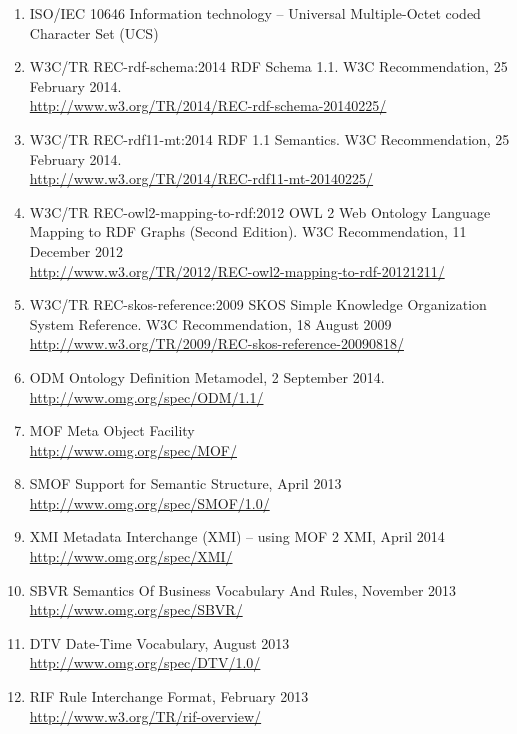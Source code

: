 \documentclass[10pt, a4paper]{isov2}
\begin{document}
\begin{enumerate}[label=\bfseries NR\arabic*]
  \item{ISO/IEC 10646} {Information technology – Universal Multiple-Octet coded Character Set (UCS)}\label{nref-UCS}
  \item{W3C/TR REC-rdf-schema:2014} {RDF Schema 1.1. W3C Recommendation, 25 February 2014.\\ \url{http://www.w3.org/TR/2014/REC-rdf-schema-20140225/}}\label{nref-RDFS}
  \item{W3C/TR REC-rdf11-mt:2014} {RDF 1.1 Semantics.  W3C Recommendation, 25 February 2014. \\ \url{http://www.w3.org/TR/2014/REC-rdf11-mt-20140225/}}\label{nref-RDFSs}
  \item{W3C/TR REC-owl2-mapping-to-rdf:2012} {OWL 2 Web Ontology Language
Mapping to RDF Graphs (Second Edition).  W3C Recommendation, 11 December 2012\\ \url{http://www.w3.org/TR/2012/REC-owl2-mapping-to-rdf-20121211/}}\label{nref-OWL2RDF}
  \item{W3C/TR REC-skos-reference:2009} {SKOS Simple Knowledge Organization System
Reference.  W3C Recommendation, 18 August 2009\\ \url{http://www.w3.org/TR/2009/REC-skos-reference-20090818/}}\label{nref-SKOS}
  \item{ODM} {Ontology Definition Metamodel, 2 September 2014. \\ \url{http://www.omg.org/spec/ODM/1.1/}}\label{nref-ODM}
\item{MOF} { Meta Object Facility} \\ \url{http://www.omg.org/spec/MOF/}\label{nref-MOF}
\item{SMOF} { Support for Semantic Structure, April 2013} \\ \url{http://www.omg.org/spec/SMOF/1.0/}\label{nref-SMOF}
\item{XMI} {Metadata Interchange (XMI) – using MOF 2 XMI, April 2014} \\ \url{http://www.omg.org/spec/XMI/}\label{nref-XMI}
\item{SBVR} {Semantics Of Business Vocabulary And Rules, November 2013} \\ \url{http://www.omg.org/spec/SBVR/}\label{nref-SBVR}
\item{DTV} {Date-Time Vocabulary, August 2013} \\ \url{http://www.omg.org/spec/DTV/1.0/}\label{nref-DTV}
\item{RIF} {Rule Interchange Format, February 2013} \\ \url{http://www.w3.org/TR/rif-overview/}\label{nref-RIF}
\end{enumerate}
\end{document}
